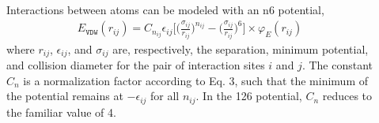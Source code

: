 \documentclass[letterpaper,10pt,english]{sphinxmanual}
\begin{document}
\begin{description}
\item[{}] \leavevmode
Interactions between atoms can be modeled with an n\sphinxhyphen{}6 potential,
\begin{equation*}
\begin{split}E_{\texttt{VDW}}(r_{ij}) = C_{n_{ij}} \epsilon_{ij} \bigg[\bigg(\frac{\sigma_{ij}}{r_{ij}}\bigg)^{n_{ij}} - \bigg(\frac{\sigma_{ij}}{r_{ij}}\bigg)^6\bigg]\times \varphi_E(r_{ij})\end{split}
\end{equation*}
where \(r_{ij}\), \(\epsilon_{ij}\), and \(\sigma_{ij}\) are, respectively, the separation, minimum potential, and collision diameter for the pair of interaction sites \(i\) and \(j\). The constant \(C_n\) is a normalization factor according to Eq. 3, such that the minimum of the potential remains at \(-\epsilon_{ij}\) for all \(n_{ij}\). In the 12\sphinxhyphen{}6 potential, \(C_n\) reduces to the familiar value of 4.


\end{description}
\end{document}
